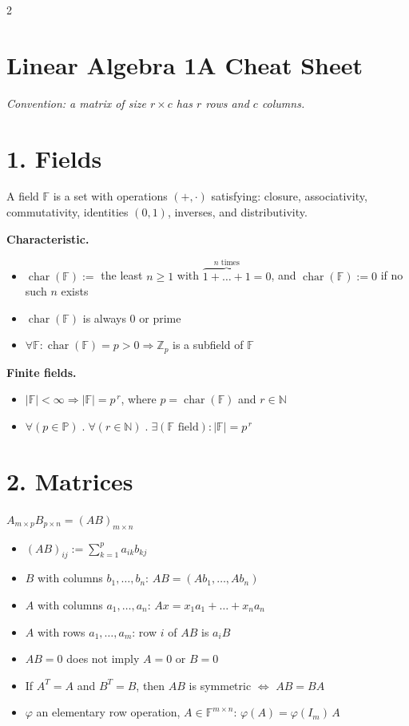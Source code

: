 \documentclass[fleqn]{article}
\newcommand{\subhead}[1]{\medskip\noindent\textbf{#1}}
\begin{document}
\raggedright

\begin{multicols}{2}

\section*{Linear Algebra 1A Cheat Sheet}

\textit{Convention: a matrix of size $r \times c$ has $r$ rows and $c$ columns.}

\section*{1. Fields}
A field $\mathbb{F}$ is a set with operations $(+,\cdot)$ satisfying: closure, associativity, commutativity, identities $(0,1)$, inverses, and distributivity.

\subhead{Characteristic.}
\begin{itemize}
\item $\operatorname{char}(\mathbb{F}):=$ the least $n \ge 1$ with $\overbrace{1+\dots+1}^{n\text{ times}}=0$, and $\operatorname{char}(\mathbb{F}):=0$ if no such $n$ exists
\item $\operatorname{char}(\mathbb{F})$ is always $0$ or prime
\item $\forall \mathbb{F} : \operatorname{char}(\mathbb{F})=p>0 \Rightarrow \mathbb{Z}_p$ is a subfield of $\mathbb{F}$
\end{itemize}

\subhead{Finite fields.}
\begin{itemize}
\item $|\mathbb{F}|<\infty \Rightarrow |\mathbb{F}|=p^{\,r}$, where $p=\operatorname{char}(\mathbb{F})$ and $r \in \mathbb{N}$
\item $\forall (p \in \mathbb{P}) \;.\; \forall (r \in \mathbb{N}) \;.\; \exists (\mathbb{F} \text{ field}) : |\mathbb{F}|=p^{\,r}$
\end{itemize}

\section*{2. Matrices}
$A_{m\times p} B_{p\times n} = (AB)_{m\times n}$
\begin{itemize}
\item $\displaystyle (AB)_{ij} := \sum_{k=1}^{p} a_{ik} b_{kj}$
\item $B$ with columns $b_1,\dots,b_n$: $AB = (Ab_1,\dots,Ab_n)$
\item $A$ with columns $a_1,\dots,a_n$: $Ax = x_1a_1 + \dots + x_na_n$
\item $A$ with rows $a_1,\dots,a_m$: row $i$ of $AB$ is $a_i B$
\item $AB = 0$ does not imply $A=0$ or $B=0$
\item If $A^T = A$ and $B^T = B$, then $AB$ is symmetric $\iff$ $AB = BA$
\item $\varphi$ an elementary row operation, $A \in \mathbb{F}^{m\times n}$: $\varphi(A) = \varphi(I_m)\,A$
\end{itemize}


\end{multicols}
\end{document}
